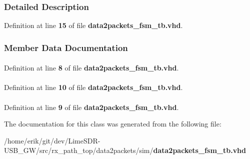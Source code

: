 \subsubsection{Detailed Description}


Definition at line {\bf 15} of file {\bf data2packets\+\_\+fsm\+\_\+tb.\+vhd}.



\subsubsection{Member Data Documentation}
\paragraph[{ieee}]{\hspace{0.3cm}{\ttfamily [Library]}}\label{classdata2packets__fsm__tb_a0a6af6eef40212dbaf130d57ce711256}


Definition at line {\bf 8} of file {\bf data2packets\+\_\+fsm\+\_\+tb.\+vhd}.

\paragraph[{numeric\+\_\+std}]{\hspace{0.3cm}{\ttfamily [Package]}}\label{classdata2packets__fsm__tb_a2edc34402b573437d5f25fa90ba4013e}


Definition at line {\bf 10} of file {\bf data2packets\+\_\+fsm\+\_\+tb.\+vhd}.

\paragraph[{std\+\_\+logic\+\_\+1164}]{\hspace{0.3cm}{\ttfamily [Package]}}\label{classdata2packets__fsm__tb_acd03516902501cd1c7296a98e22c6fcb}


Definition at line {\bf 9} of file {\bf data2packets\+\_\+fsm\+\_\+tb.\+vhd}.



The documentation for this class was generated from the following file\+:\begin{DoxyCompactItemize}
\item 
/home/erik/git/dev/\+Lime\+S\+D\+R-\/\+U\+S\+B\+\_\+\+G\+W/src/rx\+\_\+path\+\_\+top/data2packets/sim/{\bf data2packets\+\_\+fsm\+\_\+tb.\+vhd}\end{DoxyCompactItemize}
